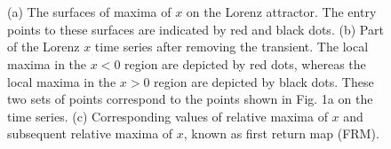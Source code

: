 \documentclass[%
 aip,
 amsmath,amssymb,
 reprint,%
]{revtex4-1}
\begin{document}
\begin{figure}[htbp]
    \centering
    \\[-1pt]
   \\[-1pt]
    \caption{(a) The surfaces of maxima of $x$ on the Lorenz attractor. The entry points to these surfaces are indicated by red and black dots. (b) Part of the Lorenz $x$ time series after removing the transient. The local maxima in the $x < 0$ region are depicted by red dots, whereas the local maxima in the $x > 0$ region are depicted by black dots. These two sets of points correspond to the points shown in Fig. 1a on the time series. (c) Corresponding values of relative maxima of $x$ and subsequent relative maxima of $x$, known as first return map (FRM).}
    

\end{figure}
\end{document}

